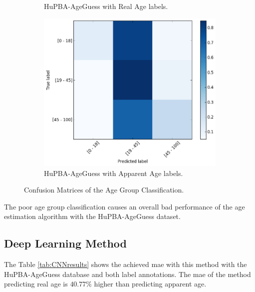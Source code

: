 \begin{figure}[!h]
\begin{subfigure}[b]{0.5\textwidth}
		\captionsetup{width=1.1\textwidth}
		\caption{HuPBA-AgeGuess with Real Age labels.}
		\label{fig:cmreal}
	\end{subfigure} %
	
	\vspace{0.5cm}
	\begin{subfigure}[b]{0.5\textwidth}
		\includegraphics[width=\textwidth]{figures/apparent_conf_mat}
		\caption{HuPBA-AgeGuess with Apparent Age labels.}
		\label{fig:cmapp}
	\end{subfigure}
	\caption{Confusion Matrices of the Age Group Classification.}\label{fig:cm}
\end{figure}

The poor age group classification causes an overall bad performance of the age estimation algorithm with the HuPBA-AgeGuess dataset.


\subsection{Deep Learning Method}

The Table \ref{tab:CNNresults} shows the achieved \gls{mae} with this method with the HuPBA-AgeGuess database and both label annotations. The \gls{mae} of the method predicting real age is $40.77\%$ higher than predicting apparent age.

